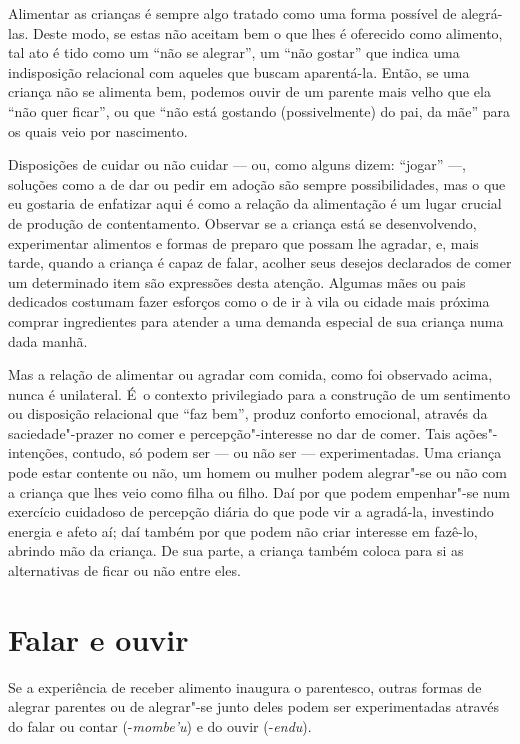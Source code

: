 Alimentar as crianças é sempre algo tratado como uma forma possível de
alegrá-las. Deste modo, se estas não aceitam bem o que lhes é oferecido
como alimento, tal ato é tido como um ``não se alegrar'', um ``não gostar'' que
indica uma indisposição relacional com aqueles que buscam aparentá-la.
Então, se uma criança não se alimenta bem, podemos ouvir de um parente
mais velho que ela ``não quer ficar'', ou que ``não está gostando
(possivelmente) do pai, da mãe'' para os quais veio por nascimento.

Disposições de cuidar ou não cuidar --- ou, como alguns dizem: ``jogar'' ---,
soluções como a de dar ou pedir em adoção são sempre possibilidades,
mas o que eu gostaria de enfatizar aqui é como a relação da alimentação
é um lugar crucial de produção de contentamento. Observar se a criança
está se desenvolvendo, experimentar alimentos e formas de preparo que
possam lhe agradar, e, mais tarde, quando a criança é capaz de falar,
acolher seus desejos declarados de comer um determinado item são
expressões desta atenção. Algumas mães ou pais dedicados costumam fazer
esforços como o de ir à vila ou cidade mais próxima comprar
ingredientes para atender a uma demanda especial de sua criança numa
dada manhã.

Mas a relação de alimentar ou agradar com comida, como foi observado
acima, nunca é unilateral. É~o contexto privilegiado para a construção
de um sentimento ou disposição relacional que ``faz bem'', produz
conforto emocional, através da saciedade"-prazer no comer e
percepção"-interesse no dar de comer. Tais ações"-intenções, contudo, só
podem ser --- ou não ser --- experimentadas. Uma criança pode estar
contente ou não, um homem ou mulher podem alegrar"-se ou não com a
criança que lhes veio como filha ou filho. Daí por que podem
empenhar"-se num exercício cuidadoso de percepção diária do que pode vir
a agradá-la, investindo energia e afeto aí; daí também por que podem
não criar interesse em fazê-lo, abrindo mão da criança. De sua parte, a
criança também coloca para si as alternativas de ficar ou não entre
eles. 

\section{Falar e ouvir}

Se a experiência de receber alimento inaugura o parentesco, outras
formas de alegrar parentes ou de alegrar"-se junto deles podem ser
experimentadas através do falar ou contar (-\emph{mombe’u}) e do ouvir
(-\emph{endu}).

